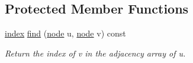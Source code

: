 \subsection*{Protected Member Functions}
\begin{DoxyCompactItemize}
\item 
\hyperlink{namespace_networ_kit_af49e67df68af41dcd75dffbb1e9abee6}{index} \hyperlink{class_networ_kit_1_1_graph_a4c6dde807d9cd6dd53f3a4794d411528}{find} (\hyperlink{namespace_networ_kit_a61914158fd771265be48de9942369160}{node} u, \hyperlink{namespace_networ_kit_a61914158fd771265be48de9942369160}{node} v) const 
\begin{DoxyCompactList}\small\item\em Return the index of v in the adjacency array of u. \end{DoxyCompactList}\end{DoxyCompactItemize}

